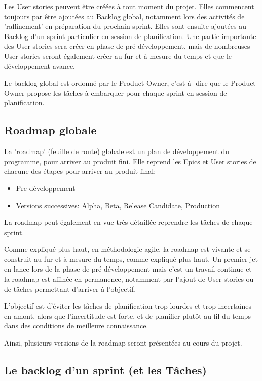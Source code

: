 Les User stories peuvent être créées à tout moment du projet. Elles commencent toujours par être ajoutées 
au Backlog global, notamment lors des activités de 'raffinement' en préparation du prochain sprint. 
Elles sont ensuite ajoutées au Backlog d’un sprint particulier en session de planification. 
Une partie importante des User stories sera créer en phase de pré-développement, mais de nombreuses 
User stories seront également créer au fur et à mesure du temps et que le développement avance.

Le backlog global est ordonné par le Product Owner, c'est-à- dire que le Product Owner propose 
les tâches à embarquer pour chaque sprint en session de planification. 


\subsection{Roadmap globale}

La 'roadmap' (feuille de route) globale est un plan de développement du programme, pour arriver au 
produit fini. Elle reprend les Epics et User stories de chacune des étapes pour arriver au produit final:
\begin{itemize}
      \item Pre-développement
      \item Versions successives: Alpha, Beta, Release Candidate, Production
\end{itemize}

La roadmap peut également en vue très détaillée reprendre les tâches de chaque sprint.

Comme expliqué plus haut, en méthodologie agile, la roadmap est vivante et se construit au fur et à mesure 
du temps, comme expliqué plus haut. Un premier jet en lance lors de la phase de pré-développement 
mais c’est un travail continue et la roadmap est affinée en permanence, notamment par l’ajout de User stories 
ou de tâches permettant d’arriver à l'objectif.

L’objectif est d'éviter les tâches de planification trop lourdes et trop incertaines en amont, 
alors que l’incertitude est forte, et de planifier plutôt au fil du temps dans des conditions de 
meilleure connaissance.

Ainsi, plusieurs versions de la roadmap seront présentées au cours du projet. 



\subsection{Le backlog d’un sprint (et les Tâches)}

